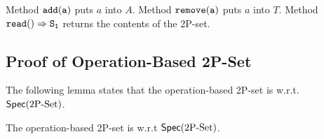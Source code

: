 Method $\alabelshort[{\tt add}]{a}$ puts $a$ into $A$. Method $\alabelshort[{\tt remove}]{a}$ puts $a$ into $T$. Method $\alabellong[{\tt read}]{}{S_1}{}$ returns the contents of the 2P-set.



\subsection{Proof of Operation-Based 2P-Set}
\label{subsec:proof of operation-based 2P-set}

The following lemma states that the operation-based 2P-set is \crdtlinearizable{} w.r.t. $\mathsf{Spec}(\text{2P\text{-}Set})$.

\begin{lemma}
\label{lemma:2P-set is correct}
The operation-based 2P-set is \crdtlinearizable{} w.r.t $\mathsf{Spec}(\text{2P\text{-}Set})$.
\end{lemma}

